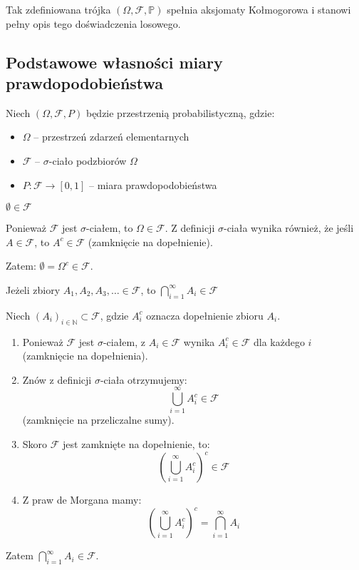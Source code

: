 \documentclass[final,a4paper,openany,12pt]{mwbk}
\begin{document}
Tak zdefiniowana trójka \((\Omega,\mathcal{F},\mathbb{P})\)
spełnia aksjomaty Kołmogorowa i stanowi pełny opis tego doświadczenia losowego.


\vspace{3mm}

\subsection{Podstawowe własności miary prawdopodobieństwa}

Niech $(\Omega, \mathcal{F}, P)$ będzie przestrzenią probabilistyczną, gdzie:
\begin{itemize}
    \item $\Omega$ -- przestrzeń zdarzeń elementarnych
    \item $\mathcal{F}$ -- $\sigma$-ciało podzbiorów $\Omega$ 
    \item $P: \mathcal{F} \to [0,1]$ -- miara prawdopodobieństwa
\end{itemize}

\begin{Tw}
$\emptyset \in \mathcal{F}$
\end{Tw}

\begin{Dow}
Ponieważ $\mathcal{F}$ jest $\sigma$-ciałem, to $\Omega \in \mathcal{F}$. Z definicji $\sigma$-ciała wynika również, że jeśli $A \in \mathcal{F}$, to $A^c \in \mathcal{F}$ (zamknięcie na dopełnienie).

Zatem: $\emptyset = \Omega^c \in \mathcal{F}$.
\end{Dow}

\begin{Tw}
Jeżeli zbiory $A_1, A_2, A_3, \ldots \in \mathcal{F}$, to $\displaystyle\bigcap_{i=1}^{\infty} A_i \in \mathcal{F}$
\end{Tw}

\begin{Dow}
Niech $(A_i)_{i\in\mathbb{N}} \subset \mathcal{F}$, gdzie $A_i^c$ oznacza dopełnienie zbioru $A_i$.

\begin{enumerate}
    \item Ponieważ $\mathcal{F}$ jest $\sigma$-ciałem, z $A_i \in \mathcal{F}$ wynika $A_i^c \in \mathcal{F}$ dla każdego $i$ (zamknięcie na dopełnienia).
    
    \item Znów z definicji $\sigma$-ciała otrzymujemy:
    $$\bigcup_{i=1}^{\infty} A_i^c \in \mathcal{F}$$
    (zamknięcie na przeliczalne sumy).
    
    \item Skoro $\mathcal{F}$ jest zamknięte na dopełnienie, to:
    $$\left(\bigcup_{i=1}^{\infty} A_i^c\right)^c \in \mathcal{F}$$
    
    \item Z praw de Morgana mamy:
    $$\left(\bigcup_{i=1}^{\infty} A_i^c\right)^c = \bigcap_{i=1}^{\infty} A_i$$
\end{enumerate}

Zatem $\displaystyle\bigcap_{i=1}^{\infty} A_i \in \mathcal{F}$.
\end{Dow}
\end{document}
